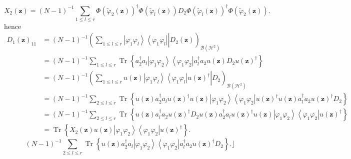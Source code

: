 \documentclass[aps,preprint]{revtex4}%
\begin{document}
\begin{equation}
X_{2}\left(  \mathbf{z}\right)  =\left(  N-1\right)  ^{-1}\sum_{1\leq l\leq
r}\Phi\left(  \tilde{\varphi}_{2}\left(  \mathbf{z}\right)  \right)
^{\dagger}\Phi\left(  \tilde{\varphi}_{l}\left(  \mathbf{z}\right)  \right)
D_{2}\Phi\left(  \tilde{\varphi}_{l}\left(  \mathbf{z}\right)  \right)
^{\dagger}\Phi\left(  \tilde{\varphi}_{2}\left(  \mathbf{z}\right)  \right)  .
\end{equation}
hence
\begin{align}
D_{1}\left(  \mathbf{z}\right)  _{11} &  =\left(  N-1\right)  ^{-1}\left(
\left.  \sum_{1\leq l\leq r}\overset{}{\left\vert \varphi_{1}\varphi
_{l}\right\rangle \left\langle \varphi_{1}\varphi_{l}\right\vert }\right\vert
D_{2}\left(  \mathbf{z}\right)  \right)  _{\mathcal{B}\left(  \mathcal{H}%
^{2}\right)  }\\
&  =\left(  N-1\right)  ^{-1}\sum_{1\leq l\leq r}\operatorname*{Tr}\left\{
a_{2}^{\dagger}a_{l}\left\vert \varphi_{1}\varphi_{2}\right\rangle
\left\langle \varphi_{1}\varphi_{2}\right\vert a_{l}^{\dagger}a_{2}u\left(
\mathbf{z}\right)  D_{2}u\left(  \mathbf{z}\right)  ^{\dagger}\right\}  \\
&  =\left(  N-1\right)  ^{-1}\left(  \left.  \sum_{1\leq l\leq r}%
\overset{}{u\left(  \mathbf{z}\right)  \left\vert \varphi_{1}\varphi
_{l}\right\rangle \left\langle \varphi_{1}\varphi_{l}\right\vert u\left(
\mathbf{z}\right)  ^{\dagger}}\right\vert D_{2}\right)  _{\mathcal{B}\left(
\mathcal{H}^{2}\right)  }\\
&  =\left(  N-1\right)  ^{-1}\sum_{2\leq l\leq r}\operatorname*{Tr}\left\{
u\left(  \mathbf{z}\right)  a_{2}^{\dagger}a_{l}u\left(  \mathbf{z}\right)
^{\dagger}u\left(  \mathbf{z}\right)  \left\vert \varphi_{1}\varphi
_{2}\right\rangle \left\langle \varphi_{1}\varphi_{2}\right\vert u\left(
\mathbf{z}\right)  ^{\dagger}u\left(  \mathbf{z}\right)  a_{l}^{\dagger}%
a_{2}u\left(  \mathbf{z}\right)  ^{\dagger}D_{2}\right\}  \\
&  =\left(  N-1\right)  ^{-1}\sum_{2\leq l\leq r}\operatorname*{Tr}\left\{
u\left(  \mathbf{z}\right)  a_{l}^{\dagger}a_{2}u\left(  \mathbf{z}\right)
^{\dagger}D_{2}u\left(  \mathbf{z}\right)  a_{2}^{\dagger}a_{l}u\left(
\mathbf{z}\right)  ^{\dagger}u\left(  \mathbf{z}\right)  \left\vert
\varphi_{1}\varphi_{2}\right\rangle \left\langle \varphi_{1}\varphi
_{2}\right\vert u\left(  \mathbf{z}\right)  ^{\dagger}\right\}  \\
&  =\operatorname*{Tr}\left\{  X_{2}\left(  \mathbf{z}\right)  u\left(
\mathbf{z}\right)  \left\vert \varphi_{1}\varphi_{2}\right\rangle \left\langle
\varphi_{1}\varphi_{2}\right\vert u\left(  \mathbf{z}\right)  ^{\dagger
}\right\}  .
\end{align}%
\begin{equation}
\left(  N-1\right)  ^{-1}\sum_{2\leq l\leq r}\operatorname*{Tr}\left\{
u\left(  \mathbf{z}\right)  a_{2}^{\dagger}a_{l}\left\vert \varphi_{1}%
\varphi_{2}\right\rangle \left\langle \varphi_{1}\varphi_{2}\right\vert
a_{l}^{\dagger}a_{2}u\left(  \mathbf{z}\right)  ^{\dagger}D_{2}\right\}
.\rfloor
\end{equation}
\end{document}
